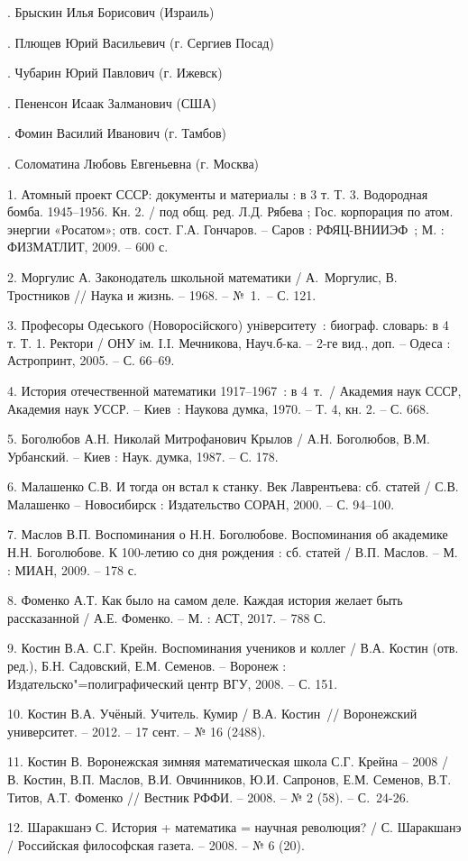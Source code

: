 .	Брыскин Илья Борисович (Израиль)

.	Плющев Юрий Васильевич (г. Сергиев Посад)

.	Чубарин Юрий Павлович (г. Ижевск)

.	Пененсон Исаак Залманович (США)

.	Фомин Василий Иванович (г. Тамбов)

.	Соломатина Любовь Евгеньевна (г. Москва)


\litlist

1.	Атомный проект СССР: документы и материалы : в 3 т. Т. 3. Водородная бомба. 1945–1956. Кн. 2. / под общ. ред. Л.Д. Рябева ; Гос. корпорация по атом. энергии «Росатом»; отв. сост. Г.А. Гончаров. – Саров : РФЯЦ-ВНИИЭФ~; М. : ФИЗМАТЛИТ, 2009. – 600 с.

2.	Моргулис А. Законодатель школьной математики / А.~Моргулис, В. Тростников // Наука и жизнь. – 1968. – №~1.~– С. 121.

3.	Професоры Одеського (Новоросiйского) унiверситету~: биограф. словарь:  в 4 т. Т. 1. Ректори / ОНУ iм. I.I. Мечникова, Науч.б-ка. – 2-ге вид., доп. – Одеса : Астропринт, 2005. – С. 66–69.

4.	История отечественной математики 1917–1967~: в 4~т.~/ Академия наук СССР, Академия наук УССР. – Киев~: Наукова думка, 1970. – Т. 4, кн. 2. – С. 668.

5.	Боголюбов А.Н. Николай Митрофанович Крылов / А.Н. Боголюбов, В.М. Урбанский. – Киев : Наук. думка, 1987. – С. 178.

6.	Малашенко С.В. И тогда он встал к станку. Век Лаврентьева: сб. статей / С.В. Малашенко – Новосибирск : Издательство СОРАН, 2000. –  С. 94–100.

7.	Маслов В.П. Воспоминания о Н.Н. Боголюбове. Воспоминания об академике Н.Н. Боголюбове. К 100-летию со дня рождения : сб. статей / В.П. Маслов. – М. : МИАН, 2009. – 178 с.

8.	Фоменко А.Т. Как было на самом деле. Каждая история желает быть рассказанной / А.Е. Фоменко. – М. : АСТ, 2017. – 788 С.

9.	Костин В.А.  С.Г. Крейн. Воспоминания учеников и коллег / В.А. Костин (отв. ред.), Б.Н. Садовский, Е.М. Семенов. – Воронеж : Издательско"=полиграфический центр ВГУ, 2008. – С. 151.

10.	Костин В.А. Учёный. Учитель. Кумир / В.А. Костин~// Воронежский университет. – 2012. – 17 сент. – № 16 (2488).

11.	Костин В. Воронежская зимняя математическая школа С.Г. Крейна – 2008 / В. Костин, В.П. Маслов, В.И. Овчинников, Ю.И. Сапронов, Е.М. Семенов, В.Т. Титов, А.Т. Фоменко // Вестник РФФИ. – 2008. – № 2 (58). – С.~24-26.

12.	Шаракшанэ С. История + математика = научная революция? / С. Шаракшанэ / Российская философская газета. – 2008. – № 6 (20).


